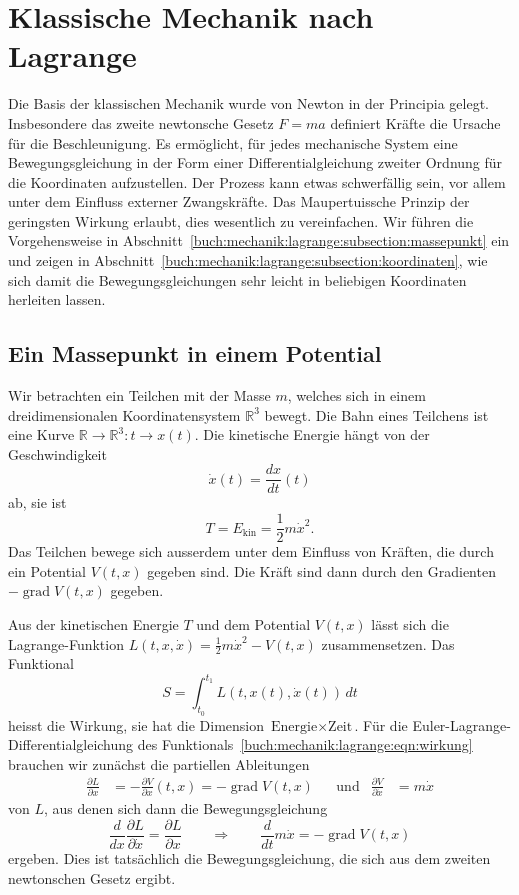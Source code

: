 %
%
%
\section{Klassische Mechanik nach Lagrange
\label{buch:mechanik:section:lagrange}}
Die Basis der klassischen Mechanik wurde von Newton in der
Principia gelegt.
Insbesondere das zweite newtonsche Gesetz
\(
F=ma
\)
definiert Kräfte die Ursache für die Beschleunigung.
Es ermöglicht, für jedes mechanische System eine Bewegungsgleichung
in der Form einer Differentialgleichung zweiter Ordnung für die
Koordinaten aufzustellen.
Der Prozess kann etwas schwerfällig sein, vor allem unter dem Einfluss
externer Zwangskräfte.
Das Maupertuissche Prinzip der geringsten Wirkung erlaubt, dies wesentlich
zu vereinfachen.
Wir führen die Vorgehensweise in
Abschnitt~\ref{buch:mechanik:lagrange:subsection:massepunkt}
ein und zeigen in
Abschnitt~\ref{buch:mechanik:lagrange:subsection:koordinaten},
wie sich damit die Bewegungsgleichungen sehr leicht in beliebigen
Koordinaten herleiten lassen.


%
%
\subsection{Ein Massepunkt in einem Potential
\label{buch:mechanik:lagrange:subsection:massepunkt}}
Wir betrachten ein Teilchen mit der Masse $m$, welches sich in
einem dreidimensionalen Koordinatensystem $\mathbb{R}^3$ bewegt.
Die Bahn eines Teilchens ist eine Kurve
$\mathbb{R}\to\mathbb{R}^3:t\to x(t)$.
Die kinetische Energie hängt von der Geschwindigkeit 
\[
\dot{x}(t) = \frac{dx}{dt}(t)
\]
ab, sie ist
\[
T=
E_{\text{kin}}
=
\frac12 m\dot{x}^2.
\]
Das Teilchen bewege sich ausserdem unter dem Einfluss von Kräften,
die durch ein Potential $V(t,x)$ gegeben sind.
Die Kräft sind dann durch den Gradienten $-\operatorname{grad}V(t,x)$ 
gegeben.

Aus der kinetischen Energie $T$ und dem Potential $V(t,x)$ lässt sich
die Lagrange-Funktion $L(t,x,\dot{x}) = \frac12m\dot{x}^2-V(t,x)$ 
zusammensetzen.
Das Funktional
\begin{equation}
S
=
\int_{t_0}^{t_1}
L(t,x(t),\dot{x}(t))
\,dt
\label{buch:mechanik:lagrange:eqn:wirkung}
\end{equation}
heisst die Wirkung, sie hat die Dimension $\text{Energie}\times\text{Zeit}$.
Für die Euler-Lagrange-Dif\-fe\-ren\-tialgleichung des
Funktionals~\eqref{buch:mechanik:lagrange:eqn:wirkung} brauchen wir
zunächst die partiellen Ableitungen
\begin{align*}
\frac{\partial L}{\partial x}
&=
-\frac{\partial V}{\partial x}(t,x)
=
-\operatorname{grad}V(t,x)
&&\text{und}&
\frac{\partial V}{\partial\dot{x}}
&=
m\dot{x}
\end{align*}
von $L$, aus denen sich dann die Bewegungsgleichung
\[
\frac{d}{dx}\frac{\partial L}{\partial\dot{x}}
=
\frac{\partial L}{\partial x}
\qquad\Rightarrow\qquad
\frac{d}{dt}m\dot{x}
=
-\operatorname{grad}V(t,x)
\]
ergeben. 
Dies ist tatsächlich die Bewegungsgleichung, die sich aus dem
zweiten newtonschen Gesetz ergibt.

